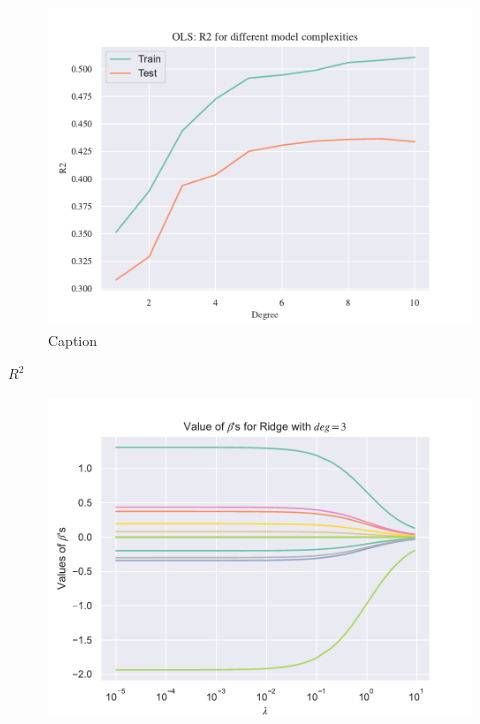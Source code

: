 \begin{figure}
    \centering
    \includegraphics[width=1\linewidth]{project_1_alt/figures/data/OLS_R2_Franke_Noise.pdf}
    \caption{Caption}
    \label{fig:r2ols}
\end{figure}

$R^2$ 

\begin{figure}
    \centering
    \includegraphics[width=1\linewidth]{project_1_alt/figures/data/Ridge_Betas_lambda_Franke_Noise_const_deg.pdf}
    \caption{}
    \label{fig:ridge_betas}
\end{figure}

